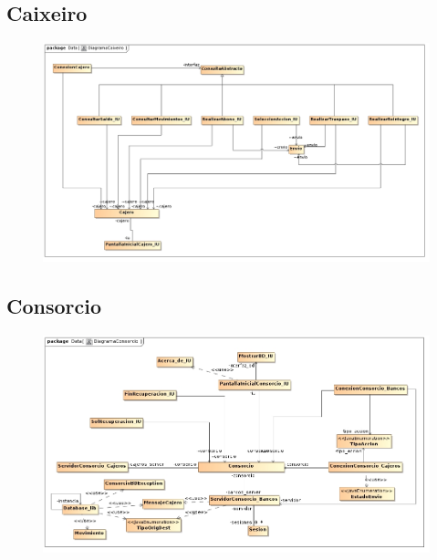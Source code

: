 \documentclass[a4paper,titlepage]{article}
\begin{document}
\clearpage

\subsection{Caixeiro}
\begin{figure}[h!]
  \begin{center}
    \includegraphics[width=0.9\textheight,angle=90]{MagicDraw/DiagramaCaixeiro.jpg}
  \end{center}
\end{figure}

\clearpage

\subsection{Consorcio}
\begin{figure}[h!]
  \begin{center}
    \includegraphics[width=0.9\textheight,angle=90]{MagicDraw/DiagramaConsorcio.jpg}
  \end{center}
\end{figure}
\end{document}
